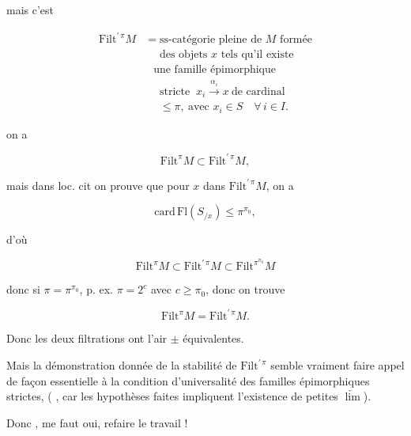 
mais c'est

\[
\begin{aligned}
\mathrm{Filt}^{\prime\,\pi}M
&=\text{ss-catégorie pleine de }M\text{ formée}\\
&\phantom{{}={}}\text{des objets }x\text{ tels qu'il existe}\\
&\phantom{{}={}}\text{une famille épimorphique}\\
&\phantom{{}={}}\text{stricte }\ x_i\xrightarrow{\alpha_i}x\ \text{de cardinal}\\
&\phantom{{}={}}\leq\pi,\ \text{avec }x_i\in S\quad\forall\,i\in I.
\end{aligned}
\tag*{(4.3.6.3)}
\]

 on a

\[
\mathrm{Filt}^\pi M\subset\mathrm{Filt}^{\prime\,\pi}M,
\]

mais dans loc. cit on prouve que pour $x$ dans $\mathrm{Filt}^{\prime\,\pi}M$, on a

\[
\mathrm{card}\,\mathrm{Fl}(S_{/x})\leq\pi^{\pi_0},
\]

d'où

\[
\mathrm{Filt}^\pi M\subset\mathrm{Filt}^{\prime\,\pi}M\subset\mathrm{Filt}^{\pi^{\pi_0}}M
\]

donc si $\pi=\pi^{\pi_0}$, p. ex. $\pi=2^c$ avec $c\geq\pi_0$, donc on trouve

\[
\mathrm{Filt}^\pi M=\mathrm{Filt}^{\prime\,\pi}M.
\]

Donc les deux filtrations ont l'air $\pm$ équivalentes. 

Mais la démonstration donnée de la  stabilité de $\mathrm{Filt}^{\prime\,\pi}$  semble vraiment faire appel de façon essentielle à la condition d'universalité des familles épimorphiques strictes, (  , \unsure{\}} car les hypothèses faites  impliquent l'existence de petites $\underleftarrow{\lim}$).

Donc , me faut  oui,  refaire le travail !

